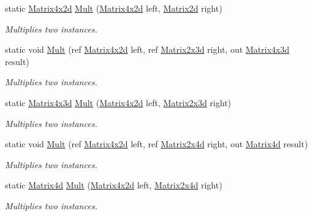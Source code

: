 \begin{DoxyCompactItemize}
static \hyperlink{struct_open_t_k_1_1_matrix4x2d}{Matrix4x2d} \hyperlink{struct_open_t_k_1_1_matrix4x2d_ab3993f26a27cfc37acc5f4040f615456}{Mult} (\hyperlink{struct_open_t_k_1_1_matrix4x2d}{Matrix4x2d} left, \hyperlink{struct_open_t_k_1_1_matrix2d}{Matrix2d} right)
\begin{DoxyCompactList}\small\item\em Multiplies two instances. \end{DoxyCompactList}\item 
static void \hyperlink{struct_open_t_k_1_1_matrix4x2d_a358f465464264b64960d598d3c9d28c6}{Mult} (ref \hyperlink{struct_open_t_k_1_1_matrix4x2d}{Matrix4x2d} left, ref \hyperlink{struct_open_t_k_1_1_matrix2x3d}{Matrix2x3d} right, out \hyperlink{struct_open_t_k_1_1_matrix4x3d}{Matrix4x3d} result)
\begin{DoxyCompactList}\small\item\em Multiplies two instances. \end{DoxyCompactList}\item 
static \hyperlink{struct_open_t_k_1_1_matrix4x3d}{Matrix4x3d} \hyperlink{struct_open_t_k_1_1_matrix4x2d_a17af80d1418a04e6858fe15cfb8ca1f1}{Mult} (\hyperlink{struct_open_t_k_1_1_matrix4x2d}{Matrix4x2d} left, \hyperlink{struct_open_t_k_1_1_matrix2x3d}{Matrix2x3d} right)
\begin{DoxyCompactList}\small\item\em Multiplies two instances. \end{DoxyCompactList}\item 
static void \hyperlink{struct_open_t_k_1_1_matrix4x2d_a29cdd4ea4e31cab10492784004740ee3}{Mult} (ref \hyperlink{struct_open_t_k_1_1_matrix4x2d}{Matrix4x2d} left, ref \hyperlink{struct_open_t_k_1_1_matrix2x4d}{Matrix2x4d} right, out \hyperlink{struct_open_t_k_1_1_matrix4d}{Matrix4d} result)
\begin{DoxyCompactList}\small\item\em Multiplies two instances. \end{DoxyCompactList}\item 
static \hyperlink{struct_open_t_k_1_1_matrix4d}{Matrix4d} \hyperlink{struct_open_t_k_1_1_matrix4x2d_a6319b3b771d632816f882022cfa0111c}{Mult} (\hyperlink{struct_open_t_k_1_1_matrix4x2d}{Matrix4x2d} left, \hyperlink{struct_open_t_k_1_1_matrix2x4d}{Matrix2x4d} right)
\begin{DoxyCompactList}\small\item\em Multiplies two instances. \end{DoxyCompactList}\item 

\end{DoxyCompactItemize}
